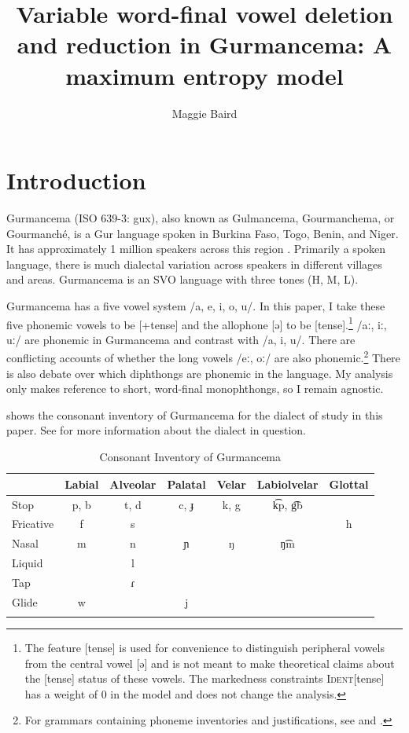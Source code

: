 \documentclass[output=paper,newtxmath,modfonts,nonflat,draftmode]{langsci/langscibook}
\title{Variable word-final vowel deletion and reduction in Gurmancema: A maximum entropy model}
\author{Maggie Baird\affiliation{Dartmouth College}}
\begin{document}
 

\maketitle
\section{Introduction}\label{sec:baird:1}
Gurmancema (ISO 639-3: gux), also known as Gulmancema, Gourmanchema, or Gourmanché, is a Gur language spoken in Burkina Faso, Togo, Benin, and Niger. It has approximately 1 million speakers across this region \citep{ethnologue}. Primarily a spoken language, there is much dialectal variation across speakers in different villages and areas. Gurmancema is an SVO language with three tones (H, M, L). 

Gurmancema has a five vowel system /a, e, i, o, u/. In this paper, I take these five phonemic vowels to be [+tense] and the allophone [ə] to be [\textminus tense].\footnote{The feature [tense] is used for convenience to distinguish peripheral vowels from the central vowel [ə] and is not meant to make theoretical claims about the [tense] status of these vowels. The markedness constraints \textsc{Ident}[tense] has a weight of 0 in the model and does not change the analysis.}  /aː, iː, uː/ are phonemic in Gurmancema and contrast with /a, i, u/. There are conflicting accounts of whether the long vowels /eː, oː/ are also phonemic.\footnote{For grammars containing phoneme inventories and justifications, see \citet{Chantoux1968} and \citet{Naba1994}.} There is also debate over which diphthongs are phonemic in the language. My analysis only makes reference to short, word-final monophthongs, so I remain agnostic.

 shows the consonant inventory of Gurmancema for the dialect of study in this paper. See  for more information about the dialect in question.

\begin{table}
\caption{Consonant Inventory of Gurmancema}
\label{tab:baird:1}
\begin{tabularx}{\textwidth}{Xcccccc}
\lsptoprule
  & Labial & Alveolar & Palatal & Velar & Labiolvelar & Glottal\\ 
 \midrule
 Stop & p, b & t, d & c, ɟ & k, g & k͡p, g͡b & \\
 Fricative & f & s &  &  &  & h\\
 Nasal & m & n & ɲ & ŋ & ŋ͡m & \\
 Liquid &  & l &  &  & & \\
 Tap &  & ɾ  &  &  &  & \\
 Glide & w & & j & &  & \\
 \lspbottomrule
 \end{tabularx}
\end{table}
\end{document}
